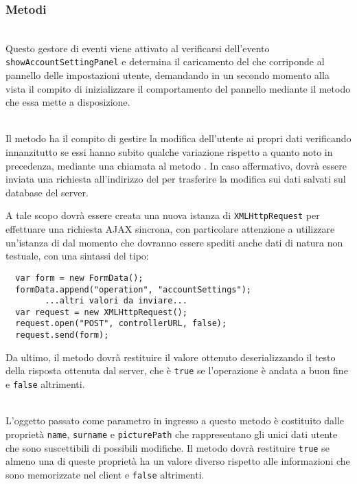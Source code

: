\subsubsection*{Metodi}
\begin{description}

\item{}\\
Questo gestore di eventi viene attivato al verificarsi dell'evento \verb'showAccountSettingPanel' e determina il caricamento del  che corriponde al pannello delle impostazioni utente, demandando in un secondo momento alla vista il compito di inizializzare il comportamento del pannello mediante il metodo  che essa mette a disposizione.

\item{}\\
Il metodo ha il compito di gestire la modifica dell'utente ai propri dati verificando innanzitutto se essi hanno subito qualche variazione rispetto a quanto noto in precedenza, mediante una chiamata al metodo . In caso affermativo, dovrà essere inviata una richiesta all'indirizzo del  per trasferire la modifica sui dati salvati sul database del server.

A tale scopo dovrà essere creata una nuova istanza di \verb'XMLHttpRequest' per effettuare una richiesta AJAX sincrona, con particolare attenzione a utilizzare un'istanza di  dal momento che dovranno essere spediti anche dati di natura non testuale, con una sintassi del tipo:
\begin{verbatim}
  var form = new FormData();
  formData.append("operation", "accountSettings");
        ...altri valori da inviare...
  var request = new XMLHttpRequest();
  request.open("POST", controllerURL, false);
  request.send(form);
\end{verbatim}

Da ultimo, il metodo dovrà restituire il valore ottenuto deserializzando il testo della risposta ottenuta dal server, che è \verb'true' se l'operazione è andata a buon fine e \verb'false' altrimenti.

\item{}\\
L'oggetto passato come parametro in ingresso a questo metodo è costituito dalle proprietà \verb'name', \verb'surname' e \verb'picturePath' che rappresentano gli unici dati utente che sono suscettibili di possibili modifiche. Il metodo dovrà restituire \verb'true' se almeno una di queste proprietà ha un valore diverso rispetto alle informazioni che sono memorizzate nel client  e \verb'false' altrimenti.

\end{description}


